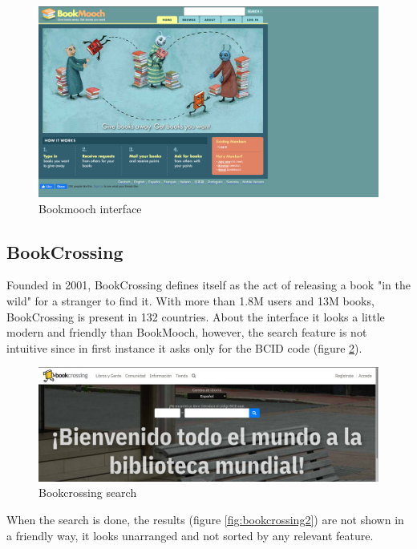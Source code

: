 \documentclass{article}
\begin{document}
\begin{figure}[h]
    \centering
    \includegraphics[scale=0.2]{img/bookmooch.png}
    \caption{Bookmooch interface}
    \label{fig:bookmooch}
\end{figure}

\subsection{BookCrossing}
Founded in 2001, BookCrossing defines itself as the act of releasing a book "in the wild" for a stranger to find it. With more than 1.8M users and 13M books, BookCrossing is present in 132 countries. About the interface it looks a little modern and friendly than BookMooch, however, the search feature is not intuitive since in first instance it asks only for the BCID code (figure \ref{fig:bookcrossing1}).

\begin{figure}[h]
    \centering
    \includegraphics[scale=0.2]{img/bookcrossing1.png}
    \caption{Bookcrossing search}
    \label{fig:bookcrossing1}
\end{figure}

When the search is done, the results (figure \ref{fig:bookcrossing2}) are not shown in a friendly way, it looks unarranged and not sorted by any relevant feature.
\end{document}
